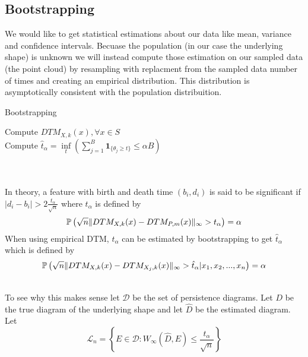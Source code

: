 \documentclass[11pt]{article}
\theoremstyle{definition}
\theoremstyle{definition}
\begin{document}
\subsection{Bootstrapping}
We would like to get statistical estimations about our data like mean, variance and confidence intervals. Becuase the population (in our case the underlying shape) is unknown we will instead compute those estimation on our sampled data (the point cloud) by resampling with replacment from the sampled data number of times and creating an empirical distribution. This distribution is asymptotically consistent with the population distribuition.\\
$\text{ }$\\
\begin{algorithm}[H]
\caption{Bootstrapping}
\SetAlgoLined
{}
Compute $DTM_{X,k}(x), \forall x \in S$\\
Compute $\hat t_\alpha = \underset{t}{\inf} \left(\sum_{j=1}^B \textbf{1}_{\{\theta_j \geq t\}} \leq \alpha B \right)$\\

\end{algorithm}

\text{ }\\
\text{ }\\
In theory, a feature with birth and death time $(b_i,d_i)$ is said to be significant if $|d_i - b_i| > 2\frac{t_\alpha}{\sqrt{n}}$ where $t_\alpha$ is defined by
$$\mathbb{P} \left( \sqrt{n} \mathopen\| DTM_{X,k}(x) - DTM_{P,m}(x) \mathclose\|_\infty > t_\alpha \right) = \alpha$$
When using empirical DTM, $t_\alpha$ can be estimated by bootstrapping to get $\hat t_\alpha$ which is defined by
$$\mathbb{P} \left( \sqrt{n} \mathopen\| DTM_{X,k}(x) - DTM_{X_j,k}(x) \mathclose\|_\infty > \hat t_\alpha | x_1,x_2,...,x_n \right) = \alpha$$

\text{ }\\
To see why this makes sense let $\mathcal{D}$ be the set of persistence diagrams. Let $D$ be the true diagram of the underlying shape and let $\hat D$ be the estimated diagram. Let
$$\mathcal{L}_n = \left\{ E \in \mathcal{D} : W_\infty(\hat D, E) \leq \frac{\hat t_\alpha}{\sqrt{n}} \right\}$$
\end{document}
